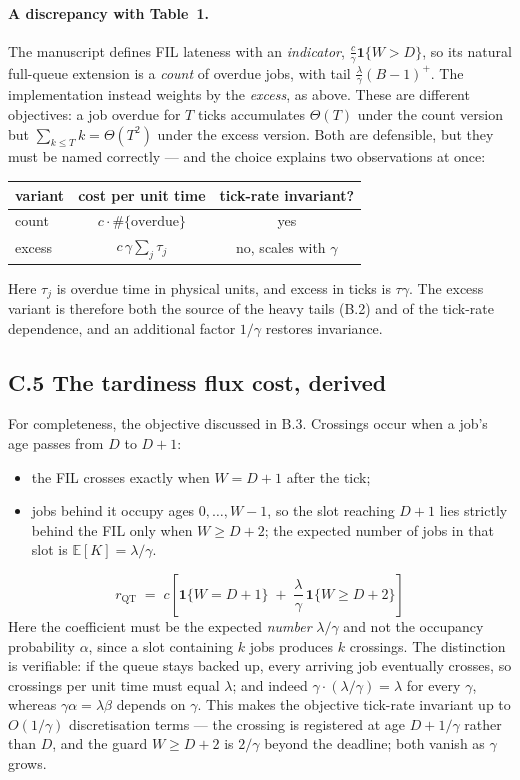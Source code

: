 \documentclass[11pt,a4paper]{article}
\newcommand{\E}{\mathbb{E}}
\begin{document}
\paragraph{A discrepancy with Table~1.}
The manuscript defines FIL lateness with an \emph{indicator},
$\frac{c}{\gamma}\mathbf{1}\{W > D\}$, so its natural full-queue extension is a
\emph{count} of overdue jobs, with tail $\frac{\lambda}{\gamma}(B-1)^+$.  The
implementation instead weights by the \emph{excess}, as above.  These are
different objectives: a job overdue for $T$ ticks accumulates $\Theta(T)$ under
the count version but $\sum_{k\le T}k = \Theta(T^2)$ under the excess version.
Both are defensible, but they must be named correctly --- and the choice explains
two observations at once:

\begin{center}
\begin{tabular}{lcc}
\toprule
variant & cost per unit time & tick-rate invariant? \\
\midrule
count  & $c \cdot \#\{\text{overdue}\}$ & yes \\
excess & $c\,\gamma \sum_j \tau_j$ & no, scales with $\gamma$ \\
\bottomrule
\end{tabular}
\end{center}
Here $\tau_j$ is overdue time in physical units, and excess in ticks is
$\tau\gamma$.  The excess variant is therefore both the source of the heavy
tails (B.2) and of the tick-rate dependence, and an additional factor $1/\gamma$
restores invariance.

\subsection*{C.5 The tardiness flux cost, derived}

For completeness, the objective discussed in B.3.  Crossings occur when a job's
age passes from $D$ to $D+1$:
\begin{itemize}
  \item the FIL crosses exactly when $W = D+1$ after the tick;
  \item jobs behind it occupy ages $0,\dots,W-1$, so the slot reaching $D+1$
  lies strictly behind the FIL only when $W \ge D+2$; the expected number of
  jobs in that slot is $\E[K] = \lambda/\gamma$.
\end{itemize}
\[
  \boxed{\;r_{\text{QT}} \;=\; c\left[\mathbf{1}\{W = D+1\}
  \;+\; \frac{\lambda}{\gamma}\,\mathbf{1}\{W \ge D+2\}\right]\;}
\]
Here the coefficient must be the expected \emph{number} $\lambda/\gamma$ and not
the occupancy probability $\alpha$, since a slot containing $k$ jobs produces
$k$ crossings.  The distinction is verifiable: if the queue stays backed up,
every arriving job eventually crosses, so crossings per unit time must equal
$\lambda$; and indeed $\gamma \cdot (\lambda/\gamma) = \lambda$ for every
$\gamma$, whereas $\gamma\alpha = \lambda\beta$ depends on $\gamma$.  This makes
the objective tick-rate invariant up to $O(1/\gamma)$ discretisation terms --- the
crossing is registered at age $D + 1/\gamma$ rather than $D$, and the guard
$W\ge D+2$ is $2/\gamma$ beyond the deadline; both vanish as $\gamma$ grows.
\end{document}
